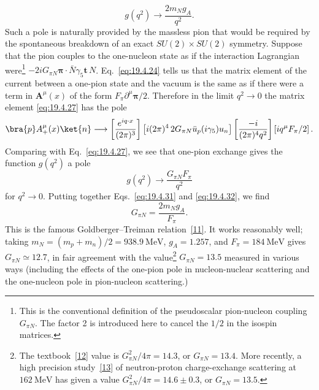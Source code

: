 \begin{equation}
g(q^2)\longrightarrow\frac{2m_Ng_A}{q^2}.
\tag{19.4.31}\label{eq:19.4.31}
\end{equation}
Such a pole is naturally provided by the massless pion that would be required by the spontaneous breakdown of an exact $SU(2)\times SU(2)$ symmetry. Suppose that the pion couples to the one-nucleon state as if the interaction Lagrangian were\footnote{This is the conventional definition of the pseudoscalar pion-nucleon coupling $G_{\pi N}$. The factor 2 is introduced here to cancel the $1/2$ in the isospin matrices.} $-2iG_{\pi N}\boldsymbol{\pi}\cdot\bar N\gamma_5\mathbf{t}\,N$. Eq.~\eqref{eq:19.4.24} tells us that the matrix element of the current between a one-pion state and the vacuum is the same as if there were a term in $\mathbf{A}^\mu(x)$ of the form $F_\pi\partial^\mu\boldsymbol{\pi}/2$. Therefore in the limit $q^2\to0$ the matrix element \eqref{eq:19.4.27} has the pole
\[
\bra{p}A_+^\mu(x)\ket{n}
\longrightarrow
\left[\frac{e^{iq\cdot x}}{(2\pi)^3}\right]
\left[i(2\pi)^4\,2G_{\pi N}\bar u_p(i\gamma_5)u_n\right]
\left[\frac{-i}{(2\pi)^4q^2}\right]
\left[iq^\mu F_\pi/2\right].
\]
Comparing with Eq.~\eqref{eq:19.4.27}, we see that one-pion exchange gives the function $g(q^2)$ a pole
\begin{equation}
g(q^2)\longrightarrow\frac{G_{\pi N}F_\pi}{q^2}
\tag{19.4.32}\label{eq:19.4.32}
\end{equation}
for $q^2\to0$. Putting together Eqs.~\eqref{eq:19.4.31} and \eqref{eq:19.4.32}, we find
\begin{equation}
G_{\pi N}=\frac{2m_Ng_A}{F_\pi}.
\tag{19.4.33}\label{eq:19.4.33}
\end{equation}
This is the famous Goldberger--Treiman relation~\hyperref[ch19-ref-11]{[11]}. It works reasonably well; taking $m_N=(m_p+m_n)/2=938.9\ \mathrm{MeV}$, $g_A=1.257$, and $F_\pi=184\ \mathrm{MeV}$ gives $G_{\pi N}\simeq12.7$, in fair agreement with the value\footnote{The textbook~\hyperref[ch19-ref-12]{[12]} value is $G_{\pi N}^2/4\pi=14.3$, or $G_{\pi N}=13.4$. More recently, a high precision study~\hyperref[ch19-ref-13]{[13]} of neutron-proton charge-exchange scattering at $162\ \mathrm{MeV}$ has given a value $G_{\pi N}^2/4\pi=14.6\pm0.3$, or $G_{\pi N}=13.5$.} $G_{\pi N}=13.5$ measured in various ways (including the effects of the one-pion pole in nucleon-nuclear scattering and the one-nucleon pole in pion-nucleon scattering.)

